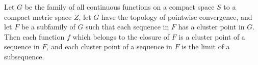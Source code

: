 Let $G$ be the family of all continuous functions on a compact space $S$ to a compact metric space $Z$, let $G$ have the topology of pointwise convergence, and let $F$ be a subfamily of $G$ such that each sequence in $F$ has a cluster point in $G$. Then each function $f$ which belongs to the closure of $F$ is a cluster point of a sequence in $F$, and each cluster point of a sequence in $F$ is the limit of a subsequence.
